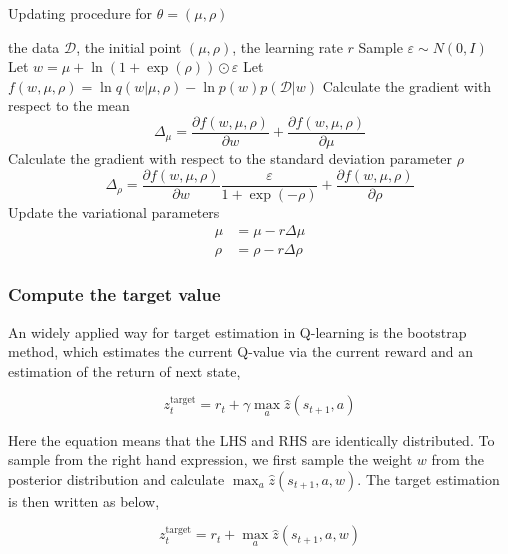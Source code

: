 \documentclass[a4paper,12pt]{article}
\begin{document}
\begin{algorithm}[htb]
\begin{algorithmic}[1]
\caption{Updating procedure for $\theta=(\mu,\rho)$}
\Require the data $\mathcal{D}$,  the initial point $(\mu,\rho)$, the learning rate $r$
\State Sample $\varepsilon\sim N(0,I)$
\State Let $w=\mu + \ln(1+\exp(\rho))\odot \varepsilon$
\State Let $f(w,\mu,\rho)=\ln q(w|\mu,\rho)-\ln p(w)p(\mathcal{D}|w)$
\State Calculate the gradient with respect to the mean
\begin{displaymath}
\Delta_\mu = \frac{\partial f(w,\mu,\rho)}{\partial w} + \frac{\partial f(w,\mu,\rho)}{\partial \mu}
\end{displaymath}
\State Calculate the gradient with respect to the standard deviation parameter $\rho$
\begin{displaymath}
\Delta_\rho = \frac{\partial f(w,\mu,\rho)}{\partial w}\frac{\varepsilon}{1 + \exp(-\rho)} + \frac{\partial f(w,\mu,\rho)}{\partial \rho}
\end{displaymath}
\State Update the variational parameters
\begin{displaymath}
\begin{aligned}
\mu &= \mu - r\Delta\mu\\
\rho &= \rho - r\Delta\rho
\end{aligned}
\end{displaymath}
\end{algorithmic}
\end{algorithm}

\subsubsection{Compute the target value}
An widely applied way for target estimation in Q-learning is the bootstrap method, which estimates the current Q-value via the current reward and an estimation of the return of next state, 

\begin{equation}
z^{\textrm{target}}_t = r_t + \gamma \max_a\hat{z}(s_{t+1}, a)
\end{equation}

Here the equation means that the LHS and RHS are identically distributed. To sample from the right hand expression, we first sample the weight $w$ from the posterior distribution and calculate $\max_a\hat{z}(s_{t+1}, a, w)$. The target estimation is then written as below, 

\begin{equation}
z^{\textrm{target}}_t = r_t + \max_a\hat{z}(s_{t+1}, a, w)
\end{equation}
\end{document}
